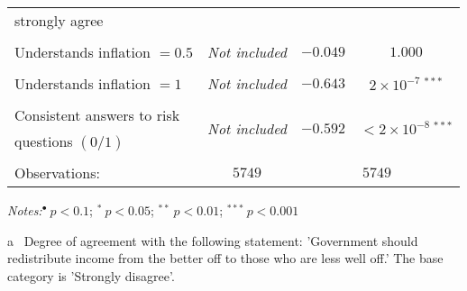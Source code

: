 \documentclass[a4paper,12pt]{article}
\begin{document}
{\begin{threeparttable}
\begin{small}
\begin{tabular}{lcccc}
\hspace{0.6cm}strongly agree\tnote{a}&&&\\%
\vspace{-0.2cm}
 \\
\vspace{-0.2cm}Understands inflation $=0.5$&\multicolumn{2}{c}{\textit{Not included}}&$-0.049$&$1.000$ \\
  \\
\vspace{-0.2cm}Understands inflation $=1$  &\multicolumn{2}{c}{\textit{Not included}}&$-0.643$& $2\times10^{-7}~^{***}$\\
    \\
  Consistent answers to risk& \multicolumn{2}{c}{\multirow{2}{*}{\textit{Not included}}} &\multirow{2}{*}{$-0.592$}&\multirow{2}{*}{$<2\times10^{-8}~^{***}$}\\
\hspace{0.6cm}questions $(0/1)$&& &\\
   \\
     \hline
  Observations: &\multicolumn{2}{c}{$5749$}&\multicolumn{2}{c}{$5749$}
\\
\hline
\end{tabular} 
\end{small}
 \begin{tablenotes}
  \begin{footnotesize}

 \item \textit{Notes:}\hspace{0.2cm}$^{\bullet}~p<0.1$; $^{*}~p<0.05$; $^{**}~p<0.01$; $^{***}~p<0.001$
 \begin{adjustwidth}{0.9cm}{}
  \vspace{-0.3cm}
  \item[a]~Degree of agreement with the following statement: 'Government should redistribute income from the better off to those who are less well off.' The base category is 'Strongly disagree'.

     \end{adjustwidth}    
\singlespacing  
  \end{footnotesize}
\end{tablenotes}
  \end{threeparttable} 
\par}

\vspace{1cm}

\pagebreak
\end{document}
